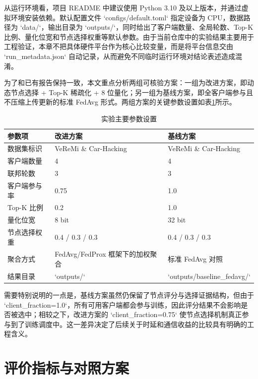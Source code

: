 从运行环境看，项目 README 中建议使用 Python 3.10 及以上版本，并通过虚拟环境安装依赖。默认配置文件 `configs/default.toml` 指定设备为 CPU，数据路径为 `data/`，输出目录为 `outputs/`，同时给出了客户端数量、全局轮数、Top-K 比例、量化位宽和节点选择权重等默认参数。由于当前仓库中的实验结果主要用于工程验证，本章不把具体硬件平台作为核心比较变量，而是将平台信息交由 `run\_metadata.json` 自动记录，从而避免不同临时运行环境对结论表述造成混淆。

为了和已有报告保持一致，本文重点分析两组可核验方案：一组为改进方案，即动态节点选择 + Top-K 稀疏化 + 8 位量化；另一组为基线方案，即全客户端参与且不压缩上传更新的标准 FedAvg 形式。两组方案的关键参数设置如表\ref{tab:experiment-settings}所示。

\begin{table}[htbp]
    \centering
    \caption{实验主要参数设置}
    \label{tab:experiment-settings}
    \begin{tabular}{p{3.0cm}p{4.0cm}p{4.0cm}}
        \toprule
        参数项 & 改进方案 & 基线方案 \\
        \midrule
        数据集标识 & VeReMi \& Car-Hacking & VeReMi \& Car-Hacking \\
        客户端数量 & 4 & 4 \\
        联邦轮数 & 3 & 3 \\
        客户端参与率 & 0.75 & 1.0 \\
        Top-K 比例 & 0.2 & 1.0 \\
        量化位宽 & 8 bit & 32 bit \\
        节点选择权重 & 0.4 / 0.3 / 0.3 & 0.4 / 0.3 / 0.3 \\
        聚合方式 & FedAvg/FedProx 框架下的加权聚合 & 标准 FedAvg 对照 \\
        结果目录 & `outputs/` & `outputs/baseline\_fedavg/` \\
        \bottomrule
    \end{tabular}
\end{table}

需要特别说明的一点是，基线方案虽然仍保留了节点评分与选择证据结构，但由于 `client\_fraction=1.0`，所有可用客户端都会参与训练，因此评分结果不会影响是否被选中；相较之下，改进方案的 `client\_fraction=0.75` 使节点选择机制真正参与到了训练调度中。这一差异决定了后续关于时延和通信收益的比较具有明确的工程含义。

\section{评价指标与对照方案}
\label{sec:experiment-metrics-baselines}

